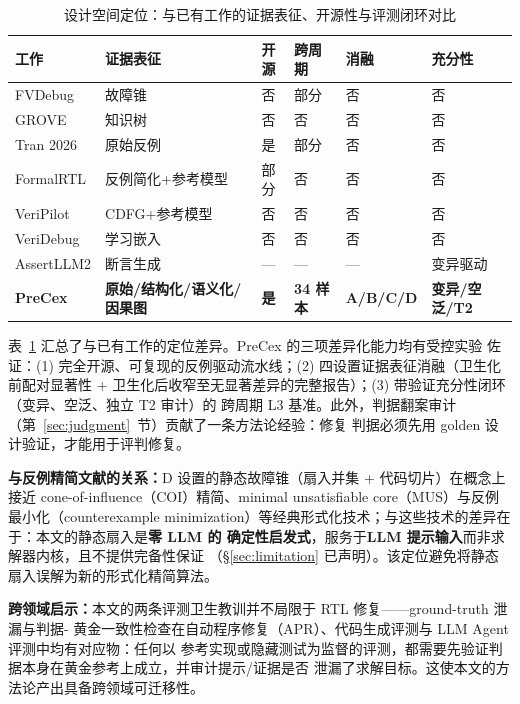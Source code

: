 \documentclass[twocolumn,10pt]{ctexart}
\begin{document}
\begin{table}[!t]
\centering
\caption{设计空间定位：与已有工作的证据表征、开源性与评测闭环对比}
\label{tab:positioning}
\scriptsize
\setlength{\tabcolsep}{2pt}
\renewcommand{\arraystretch}{1.12}
\begin{tabular}{p{}p{}c p{}p{}p{}}
\toprule
\textbf{工作} & \textbf{证据表征} & \textbf{开源} & \textbf{跨周期} & \textbf{消融} & \textbf{充分性} \\
\midrule
FVDebug & 故障锥 & 否 & 部分 & 否 & 否 \\
GROVE & 知识树 & 否 & 否 & 否 & 否 \\
Tran 2026 & 原始反例 & 是 & 部分 & 否 & 否 \\
FormalRTL & 反例简化+参考模型 & 部分 & 否 & 否 & 否 \\
VeriPilot & CDFG+参考模型 & 否 & 否 & 否 & 否 \\
VeriDebug & 学习嵌入 & 否 & 否 & 否 & 否 \\
AssertLLM2 & 断言生成 & --- & --- & --- & 变异驱动 \\
\textbf{PreCex} & \textbf{原始/结构化/语义化/因果图} & \textbf{是} & \textbf{34 样本} & \textbf{A/B/C/D} & \textbf{变异/空泛/T2} \\
\bottomrule
\end{tabular}
\end{table}

表~\ref{tab:positioning} 汇总了与已有工作的定位差异。PreCex 的三项差异化能力均有受控实验
佐证：(1) 完全开源、可复现的反例驱动流水线；(2) 四设置证据表征消融（卫生化前配对显著性 +
卫生化后收窄至无显著差异的完整报告）；(3) 带验证充分性闭环（变异、空泛、独立 T2 审计）的
跨周期 L3 基准。此外，判据翻案审计（第~\ref{sec:judgment}~节）贡献了一条方法论经验：修复
判据必须先用 golden 设计验证，才能用于评判修复。

\textbf{与反例精简文献的关系：}D 设置的静态故障锥（扇入并集 + 代码切片）在概念上接近
cone-of-influence（COI）精简、minimal unsatisfiable core（MUS）与反例最小化（counterexample
minimization）等经典形式化技术；与这些技术的差异在于：本文的静态扇入是\textbf{零 LLM 的
确定性启发式}，服务于\textbf{LLM 提示输入}而非求解器内核，且不提供完备性保证
（\S\ref{sec:limitation} 已声明）。该定位避免将静态扇入误解为新的形式化精简算法。

\textbf{跨领域启示：}本文的两条评测卫生教训并不局限于 RTL 修复——ground-truth 泄漏与判据-
黄金一致性检查在自动程序修复（APR）、代码生成评测与 LLM Agent 评测中均有对应物：任何以
参考实现或隐藏测试为监督的评测，都需要先验证判据本身在黄金参考上成立，并审计提示/证据是否
泄漏了求解目标。这使本文的方法论产出具备跨领域可迁移性。
\end{document}
